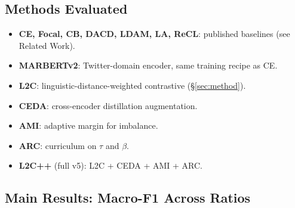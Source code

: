 \documentclass[11pt,a4paper,twocolumn]{article}
\newcommand{\method}{L2C}
\newcommand{\ceda}{CEDA}
\newcommand{\ami}{AMI}
\newcommand{\arc}{ARC}
\begin{document}
\subsection{Methods Evaluated}
\label{sec:methods-list}
\begin{itemize}\itemsep0pt
\item \textbf{CE, Focal, CB, DACD, LDAM, LA, ReCL}: published
baselines (see Related Work).
\item \textbf{MARBERTv2}: Twitter-domain encoder, same training
recipe as CE.
\item \textbf{\method{}}: linguistic-distance-weighted contrastive
(§\ref{sec:method}).
\item \textbf{\ceda{}}: cross-encoder distillation augmentation.
\item \textbf{\ami{}}: adaptive margin for imbalance.
\item \textbf{\arc{}}: curriculum on $\tau$ and $\beta$.
\item \textbf{L2C++} (full v5): \method{} + \ceda{} + \ami{} + \arc{}.
\end{itemize}

\subsection{Main Results: Macro-F1 Across Ratios}
\end{document}
